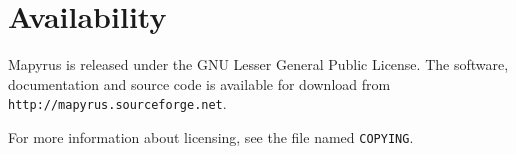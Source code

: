 \section{Availability}

Mapyrus is released under the GNU Lesser General Public License.
The software, documentation and source code is available for download
from \\
\texttt{http://mapyrus.sourceforge.net}.

For more information about licensing, see the file named \texttt{COPYING}.


